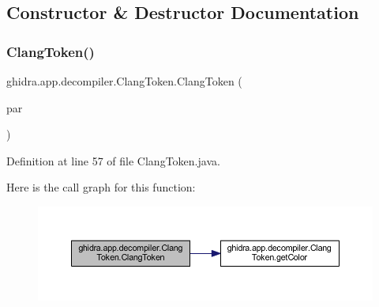 \subsection{Constructor \& Destructor Documentation}
\mbox{\label{classghidra_1_1app_1_1decompiler_1_1_clang_token_a8fef517c1b71fcd24e3e8677e91c4397}} 
\subsubsection{\texorpdfstring{ClangToken()}{ClangToken()}\hspace{0.1cm}{\footnotesize\ttfamily [1/3]}}
{\footnotesize\ttfamily ghidra.\+app.\+decompiler.\+Clang\+Token.\+Clang\+Token (\begin{DoxyParamCaption}\item[{\mbox{\hyperlink{interfaceghidra_1_1app_1_1decompiler_1_1_clang_node}{Clang\+Node}}}]{par }\end{DoxyParamCaption})\hspace{0.3cm}{\ttfamily [inline]}}



Definition at line 57 of file Clang\+Token.\+java.

Here is the call graph for this function\+:
\nopagebreak
\begin{figure}[H]
\begin{center}
\leavevmode
\includegraphics[width=350pt]{classghidra_1_1app_1_1decompiler_1_1_clang_token_a8fef517c1b71fcd24e3e8677e91c4397_cgraph}
\end{center}
\end{figure}
\mbox{\label{classghidra_1_1app_1_1decompiler_1_1_clang_token_ad21f7bf2e47d465f0b37d2b6ae6ef146}} 

